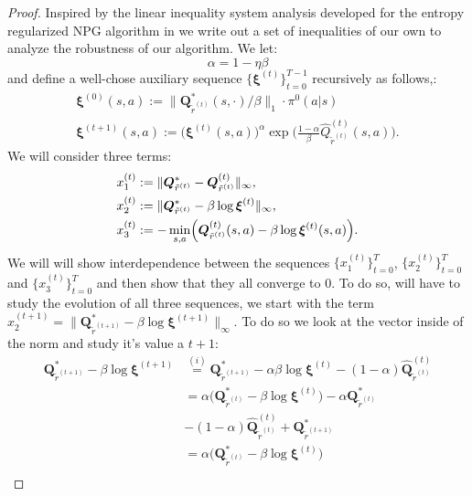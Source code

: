 \begin{proof}
    
Inspired by the linear inequality system analysis developed for the entropy regularized NPG algorithm in \cite{Cen2021} we write out a set of inequalities of our own to analyze the robustness of our algorithm. We let: \[\alpha=1-\eta\beta\] and define a well-chose auxiliary sequence $\big\{\bm{\xi}^{(t)}\big\}_{t=0}^{T-1}$ recursively as follows,:
\begin{align}
    \label{eq:aux_seq_init}
    \bm{\xi}^{(0)}(s,a) := \|\bm{Q}^*_{\tilde{r}^{(t)}}(s,\cdot)/\beta\|_1 \cdot \pi^{0}(a|s) \\
    \label{eq:aux_seq_step}
    \bm{\xi}^{(t+1)}(s,a) := \bigl(\bm{\xi}^{(t)}(s,a) \bigr)^\alpha \exp\Bigg( \frac{1-\alpha}{\beta} \hat{Q}^{(t)}_{\tilde{r}^{(t)}}(s,a) \Bigg).
\end{align}
We will consider three terms:
\begin{align}
    \label{eq:term_1}
    x_1^{(t)} &:= \| \bm{Q}^*_{\tilde{r}^{(t)}}
    -\bm{Q}^{(t)}_{\tilde{r}^{(t)}} \|_\infty, \\
    \label{eq:term_2}
    x_2^{(t)} &:= \| \bm{Q}_{\tilde{r}^{(t)}}^*
    - \beta \log \bm{\xi}^{(t)} \|_\infty, \\
    \label{eq:term_3}
    x_3^{(t)} &:= -\min_{s,a} \Bigl(\bm{Q}^{(t)}_{\tilde{r}^{(t)}}(s,a) - \beta \log \bm{\xi}^{(t)}(s,a)  \Bigr).
\end{align}
We will will show interdependence between the sequences $\{x_1^{(t)}\}_{t=0}^T$, $\{x_2^{(t)}\}_{t=0}^T$ and $\{x_3^{(t)}\}_{t=0}^T$ and then show that they all converge to $0$. To do so, will have to study the evolution of all three sequences, we start with the term $x_2^{(t+1)} = \|\bm{Q}_{\tilde{r}^{(t+1)}}^* - \beta \log \bm{\xi}^{(t+1)} \|_\infty$. To do so we look at the vector inside of the norm and study it's value a $t+1$:
\begin{align*}
    \bm{Q}_{\tilde{r}^{(t+1)}}^* - \beta \log \bm{\xi}^{(t+1)}  
    &\stackrel{(i)}{=} \bm{Q}_{\tilde{r}^{(t+1)}}^* 
    - \alpha \beta \log \bm{\xi}^{(t)}
    - (1-\alpha) \hat{\bm{Q}}^{(t)}_{\tilde{r}^{(t)}} \\
    &= \alpha \Big( \bm{Q}_{\tilde{r}^{(t)}}^* 
    -  \beta \log \bm{\xi}^{(t)}  \Big) - \alpha \bm{Q}_{\tilde{r}^{(t)}}^*  \\ &
    - (1-\alpha) \hat{\bm{Q}}^{(t)}_{\tilde{r}^{(t)}}  + \bm{Q}_{\tilde{r}^{(t+1)}}^*  \\
    &= \alpha \Big( \bm{Q}_{\tilde{r}^{(t)}}^* 
    -  \beta \log \bm{\xi}^{(t)}  \Big) \\ &

\end{align*}
\end{proof}
